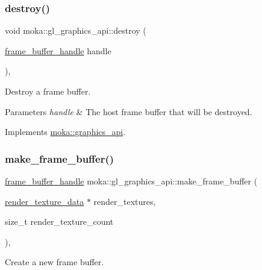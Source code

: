 \subsubsection{\texorpdfstring{destroy()}{destroy()}}
{\footnotesize\ttfamily void moka\+::gl\+\_\+graphics\+\_\+api\+::destroy (\begin{DoxyParamCaption}\item[{\mbox{\hyperlink{structmoka_1_1frame__buffer__handle}{frame\+\_\+buffer\+\_\+handle}}}]{handle }\end{DoxyParamCaption})\hspace{0.3cm}{\ttfamily [override]}, {\ttfamily [virtual]}}



Destroy a frame buffer. 


\begin{DoxyParams}{Parameters}
{\em handle} & The host frame buffer that will be destroyed. \\
\hline
\end{DoxyParams}


Implements \mbox{\hyperlink{classmoka_1_1graphics__api_a493d46d804ed3dcbe6e9b8bd20d5bb6f}{moka\+::graphics\+\_\+api}}.

\mbox{\label{classmoka_1_1gl__graphics__api_a9cea47f96f495dfba6b54d0aedea7d50}} 
\subsubsection{\texorpdfstring{make\_frame\_buffer()}{make\_frame\_buffer()}}
{\footnotesize\ttfamily \mbox{\hyperlink{structmoka_1_1frame__buffer__handle}{frame\+\_\+buffer\+\_\+handle}} moka\+::gl\+\_\+graphics\+\_\+api\+::make\+\_\+frame\+\_\+buffer (\begin{DoxyParamCaption}\item[{\mbox{\hyperlink{structmoka_1_1render__texture__data}{render\+\_\+texture\+\_\+data}} $\ast$}]{render\+\_\+textures,  }\item[{size\+\_\+t}]{render\+\_\+texture\+\_\+count }\end{DoxyParamCaption})\hspace{0.3cm}{\ttfamily [override]}, {\ttfamily [virtual]}}



Create a new frame buffer. 



